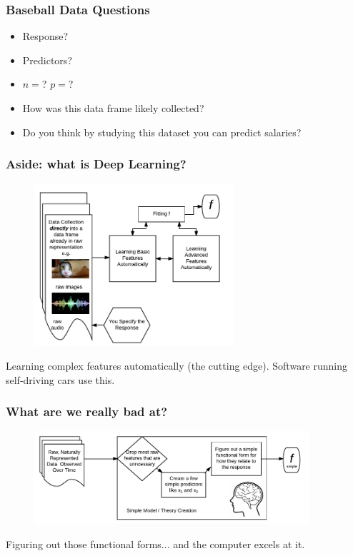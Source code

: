 \documentclass[handout]{beamer}
\begin{document}
\begin{frame}\frametitle{Baseball Data Questions}

\begin{itemize}
\item Response?
\item Predictors?
\item $n = $? $p = $?
\item How was this data frame likely collected?
\item Do you think by studying this dataset you can predict salaries?
\end{itemize}

	
\end{frame}


\begin{frame}\frametitle{Aside: what is Deep Learning?}
\begin{figure}
\centering
\includegraphics[width=2.9in]{deep_learning}
\end{figure}

Learning complex features automatically (the cutting edge). Software running self-driving cars use this.
\end{frame}


\begin{frame}\frametitle{What are we really bad at?}

\begin{figure}
\centering
\includegraphics[width=4in]{human_simple_model_learning}
\end{figure}

Figuring out those functional forms... and the computer excels at it.

\end{frame}
\end{document}
